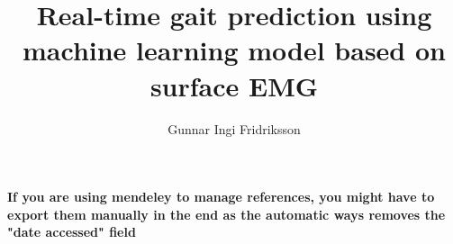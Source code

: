 \documentclass[12pt,twoside]{article}
\title{Real-time gait prediction using machine learning model based on surface EMG}
\author{Gunnar Ingi Fridriksson}
\begin{document}



\pagestyle{empty}
\insertempty



\customtoc


\restoregeometry
\pagestyle{fancy}






% 

\newpage
{}
\textbf{If you are using mendeley to manage references, you might have to export them manually in the end as the automatic ways removes the "date accessed" field}
\printbibliography



\end{document}
